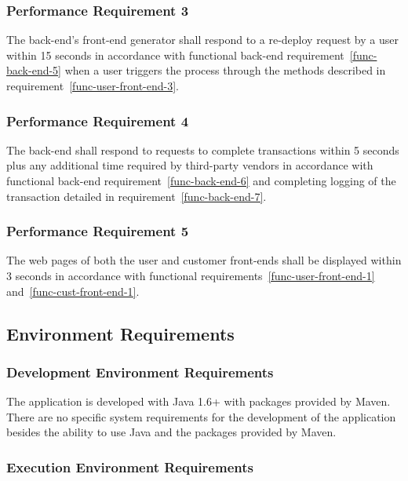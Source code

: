 \documentclass{article}
\begin{document}
\subsubsection{Performance Requirement 3}
\label{perf-back-end-3}

The back-end's front-end generator shall respond to a re-deploy request by a
user within 15 seconds in accordance with functional back-end
requirement~\ref{func-back-end-5} when a user triggers the process through the
methods described in requirement~\ref{func-user-front-end-3}.

\subsubsection{Performance Requirement 4}
\label{perf-back-end-4}

The back-end shall respond to requests to complete transactions within 5 seconds
plus any additional time required by third-party vendors in accordance with
functional back-end requirement~\ref{func-back-end-6} and completing logging of
the transaction detailed in requirement~\ref{func-back-end-7}.

\subsubsection{Performance Requirement 5}
\label{perf-back-end-5}

The web pages of both the user and customer front-ends shall be displayed within
3 seconds in accordance with functional requirements~\ref{func-user-front-end-1}
and~\ref{func-cust-front-end-1}.

\pagebreak
\subsection{Environment Requirements}

\subsubsection{Development Environment Requirements}

The application is developed with Java 1.6+ with packages provided by
Maven.  There are no specific system requirements for the development of
the application besides the ability to use Java and the packages provided
by Maven.

\subsubsection{Execution Environment Requirements}
\end{document}
